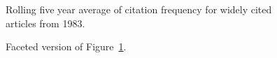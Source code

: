 \documentclass[
  10pt,
  letterpaper,
  DIV=11,
  numbers=noendperiod,
  twoside]{scrartcl}
\begin{document}
\begin{figure}


\caption{\label{fig-citation-spaghetti-1983}Rolling five year average of
citation frequency for widely cited articles from 1983.}

\end{figure}%

\begin{figure}


\caption{\label{fig-citation-facet-1983}Faceted version of
Figure~\ref{fig-citation-spaghetti-1983}.}

\end{figure}%
\end{document}
